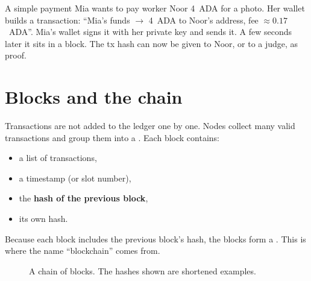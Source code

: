 \begin{examplebox}{A simple payment}
Mia wants to pay worker Noor 4~ADA for a photo. Her wallet builds a transaction: ``Mia's funds $\rightarrow$ 4~ADA to Noor's address, fee $\approx 0.17$~ADA''. Mia's wallet signs it with her private key and sends it. A few seconds later it sits in a block. The tx hash can now be given to Noor, or to a judge, as proof.
\end{examplebox}

\section{Blocks and the chain}

Transactions are not added to the ledger one by one. Nodes collect many valid transactions and group them into a . Each block contains:
\begin{itemize}
  \item a list of transactions,
  \item a timestamp (or slot number),
  \item the \textbf{hash of the previous block},
  \item its own hash.
\end{itemize}
Because each block includes the previous block's hash, the blocks form a . This is where the name ``blockchain'' comes from.

\begin{figure}[h]
\centering
{}
\caption{A chain of blocks. The hashes shown are shortened examples.}
\end{figure}

